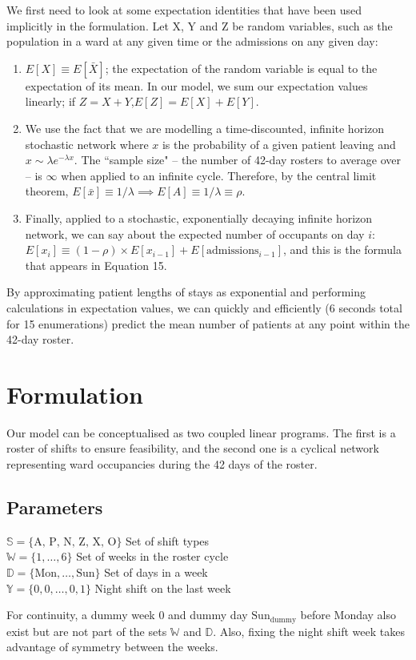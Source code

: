 \documentclass[a4paper]{article}
\begin{document}
We first need to look at some expectation identities that have been used implicitly in the formulation. Let X, Y and Z be random variables, such as the population in a ward at any given time or the admissions on any given day:
\begin{enumerate}
\item $E[X] \equiv E[\bar{X}]$; the expectation of the random variable is equal to the expectation of its mean. In our model, we sum our expectation values linearly; if $Z= X + Y$,\quad $E[Z] = E[X] + E[Y]$.
\item We use the fact that we are modelling a time-discounted, infinite horizon stochastic network where $x$ is the probability of a given patient leaving and $x\sim \lambda e^{-\lambda x}$. The ``sample size" -- the number of 42-day rosters to average over -- is $\infty$ when applied to an infinite cycle. Therefore, by the central limit theorem, $E[\bar{x}] \equiv 1/\lambda \implies E[A] \equiv 1/\lambda \equiv \rho$.
\item Finally, applied to a stochastic, exponentially decaying infinite horizon network, we can say about the expected number of occupants on day $i$: $E[x_i] \equiv (1-\rho) \times E[x_{i-1}] + E[\text{admissions}_{i-1}]$, and this is the formula that appears in Equation 15.
\end{enumerate}

By approximating patient lengths of stays as exponential and performing calculations in expectation values, we can quickly and efficiently (6 seconds total for 15 enumerations) predict the mean number of patients at any point within the 42-day roster.
\fi
\section{Formulation}

Our model can be conceptualised as two coupled linear programs. The first is a roster of shifts to ensure feasibility, and the second one is a cyclical network representing ward occupancies during the 42 days of the roster.

\subsection{Parameters}
\begin{multicols}{2}
\noindent


$\mathbb{S} = \{\text{A, P, N, Z, X, O}\}$ \dotfill Set of shift types\\
$\mathbb{W} = \{1, \dots, 6\}$ \dotfill Set of weeks in the roster cycle\\
$\mathbb{D} = \{\text{Mon},\dots,\text{Sun}\}$ \dotfill Set of days in a week\\
$\mathbb{Y}  = \{0, 0,\dots, 0, 1\}$ \dotfill Night shift on the last week

For continuity, a dummy week $0$ and dummy day $\text{Sun}_\text{dummy}$ before Monday also exist but are not part of the sets $\mathbb{W}$ and $\mathbb{D}$. Also, fixing the night shift week takes advantage of symmetry between the weeks.
\end{multicols}
\end{document}
